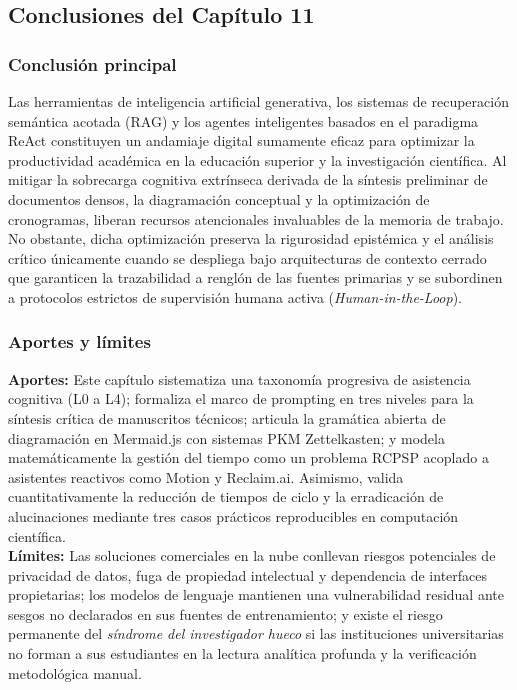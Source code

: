 \newpage
{}
\subsection*{Conclusiones del Capítulo 11}

\subsubsection*{Conclusión principal}
Las herramientas de inteligencia artificial generativa, los sistemas de recuperación semántica acotada (RAG) y los agentes inteligentes basados en el paradigma ReAct constituyen un andamiaje digital sumamente eficaz para optimizar la productividad académica en la educación superior y la investigación científica. Al mitigar la sobrecarga cognitiva extrínseca derivada de la síntesis preliminar de documentos densos, la diagramación conceptual y la optimización de cronogramas, liberan recursos atencionales invaluables de la memoria de trabajo. No obstante, dicha optimización preserva la rigurosidad epistémica y el análisis crítico únicamente cuando se despliega bajo arquitecturas de contexto cerrado que garanticen la trazabilidad a renglón de las fuentes primarias y se subordinen a protocolos estrictos de supervisión humana activa (\textit{Human-in-the-Loop}).

\subsubsection*{Aportes y límites}
\textbf{Aportes:} Este capítulo sistematiza una taxonomía progresiva de asistencia cognitiva (L0 a L4); formaliza el marco de prompting en tres niveles para la síntesis crítica de manuscritos técnicos; articula la gramática abierta de diagramación en Mermaid.js con sistemas PKM Zettelkasten; y modela matemáticamente la gestión del tiempo como un problema RCPSP acoplado a asistentes reactivos como Motion y Reclaim.ai. Asimismo, valida cuantitativamente la reducción de tiempos de ciclo y la erradicación de alucinaciones mediante tres casos prácticos reproducibles en computación científica.\\[0.1cm]
\textbf{Límites:} Las soluciones comerciales en la nube conllevan riesgos potenciales de privacidad de datos, fuga de propiedad intelectual y dependencia de interfaces propietarias; los modelos de lenguaje mantienen una vulnerabilidad residual ante sesgos no declarados en sus fuentes de entrenamiento; y existe el riesgo permanente del \textit{síndrome del investigador hueco} si las instituciones universitarias no forman a sus estudiantes en la lectura analítica profunda y la verificación metodológica manual.


